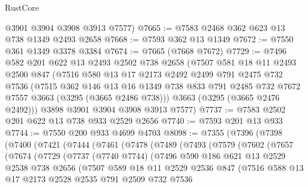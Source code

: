 \begin{lexlean}{RustCore}
\begin{coremodule}
      @3901
      @3904
      @3908
      @3913
      @7577)
@7665 := @7583 @2468 @362 @623 @13 @738 @1349 @2493 @2658
@7668 := @7593 @362 @13 @1349
@7672 := @7550 @361 @1349 @3378 @3384
@7674 := @7665 (@7668 @7672)
@7729 := @7496
    @582
    @201
    @622
    @13
    @2493
    @2502
    @738
    @2658
    (@7507
      @581
      @18
      @11
      @2493
      @2500
      @847
      (@7516
        @580
        @13
        @17
        @2173
        @2492
        @2499
        @791
        @2475
        @732
        @7536
        (@7515
          @362
          @146
          @13
          @16
          @1349
          @738
          @833
          @791
          @2485
          @732
          @7672
          @7557
          @3663
          (@3295 (@3665 @2486 @738)))
        @3663
        (@3295 (@3665 @2476 @2492)))
      @3898
      @3901
      @3904
      @3908
      @3913
      @7577)
@7737 := @7583 @2502 @201 @622 @13 @738 @933 @2529 @2656
@7740 := @7593 @201 @13 @933
@7744 := @7550 @200 @933 @4699 @4703
@8098 := @7355
    (@7396
      (@7398
        (@7400
          (@7421
            (@7444
              (@7461
                (@7478
                  (@7489
                    (@7493
                      (@7579
                        (@7602
                          (@7657
                            (@7674
                              (@7729
                                (@7737
                                  (@7740 @7744)
                                  (@7496
                                    @590
                                    @186
                                    @621
                                    @13
                                    @2529
                                    @2538
                                    @738
                                    @2656
                                    (@7507
                                      @589
                                      @18
                                      @11
                                      @2529
                                      @2536
                                      @847
                                      (@7516
                                        @588
                                        @13
                                        @17
                                        @2173
                                        @2528
                                        @2535
                                        @791
                                        @2509
                                        @732
                                        @7536

\end{coremodule}
\end{lexlean}

